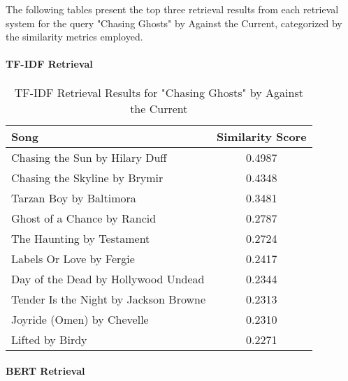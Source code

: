 \documentclass[sigconf]{acmart}
\begin{document}
The following tables present the top three retrieval results from each retrieval system for the query "Chasing Ghosts" by Against the Current, categorized by the similarity metrics employed.

\paragraph{TF-IDF Retrieval}

\begin{table}[ht]
    \centering
    \caption{TF-IDF Retrieval Results for "Chasing Ghosts" by Against the Current}
    \label{tab:tfidf_chasing_ghosts}
    \begin{tabular}{lc}
        \toprule
        \textbf{Song}                        & \textbf{Similarity Score} \\
        \midrule
        Chasing the Sun by Hilary Duff        & 0.4987                      \\
        Chasing the Skyline by Brymir         & 0.4348                      \\
        Tarzan Boy by Baltimora                & 0.3481                      \\
        Ghost of a Chance by Rancid            & 0.2787                      \\
        The Haunting by Testament              & 0.2724                      \\
        Labels Or Love by Fergie                & 0.2417                      \\
        Day of the Dead by Hollywood Undead    & 0.2344                      \\
        Tender Is the Night by Jackson Browne   & 0.2313                      \\
        Joyride (Omen) by Chevelle              & 0.2310                      \\
        Lifted by Birdy                         & 0.2271                      \\
        \bottomrule
    \end{tabular}
\end{table}

\paragraph{BERT Retrieval}
\end{document}
